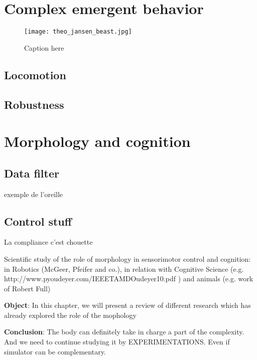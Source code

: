 \section{Complex emergent behavior} %


\begin{figure}[]
\centering
    \hfil
    \hfil
    \caption{}
    \label{fig:}
\end{figure}


\begin{figure}[]
    \begin{center}
        \texttt{[image: theo\_jansen\_beast.jpg]}
    \end{center}
    \caption{Caption here}
    \label{fig:figure1}
\end{figure}










\subsection{Locomotion} %

\subsection{Robustness} %


\section{Morphology and cognition} %

\subsection{Data filter} %

exemple de l'oreille

\subsection{Control stuff} %

La compliance c'est chouette


Scientific study of the role of morphology in sensorimotor control and cognition: in Robotics (McGeer, Pfeifer and co.), in relation with Cognitive Science (e.g. http://www.pyoudeyer.com/IEEETAMDOudeyer10.pdf ) and animals (e.g. work of Robert Full)

\textbf{Object}: In this chapter, we will present a review of different research which has already explored the role of the mophology


\textbf{Conclusion}: The body can definitely take in charge a part of the complexity. And we need to continue studying it by EXPERIMENTATIONS. Even if simulator can be complementary.


